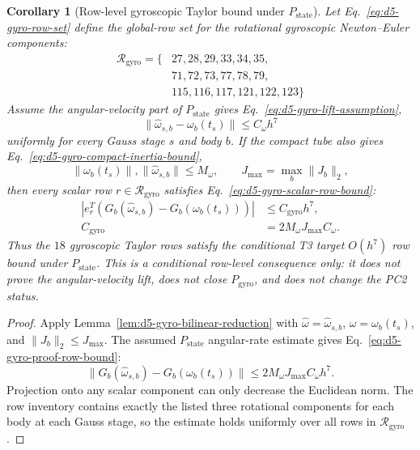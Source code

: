 \documentclass[preprint,12pt]{elsarticle}
\newtheorem{corollary}{Corollary}
\begin{document}
\begin{corollary}[Row-level gyroscopic Taylor bound under \(P_{\mathrm{state}}\)]
\label{cor:d5-gyro-row-bound-under-pstate}
Let Eq.~\eqref{eq:d5-gyro-row-set} define the global-row set for the
rotational gyroscopic Newton--Euler components:
\begin{equation}
\label{eq:d5-gyro-row-set}
\begin{aligned}
\mathcal R_{\mathrm{gyro}}=\{&
27,28,29,33,34,35,\\
&71,72,73,77,78,79,\\
&115,116,117,121,122,123\}
\end{aligned}
\end{equation}
Assume the angular-velocity part of \(P_{\mathrm{state}}\) gives
Eq.~\eqref{eq:d5-gyro-lift-assumption},
\begin{equation}
\label{eq:d5-gyro-lift-assumption}
  \|\widehat\omega_{s,b}-\omega_b(t_s)\|\le C_\omega h^7
\end{equation}
uniformly for every Gauss stage \(s\) and body \(b\).  If the compact tube
also gives Eq.~\eqref{eq:d5-gyro-compact-inertia-bound},
\begin{equation}
\label{eq:d5-gyro-compact-inertia-bound}
  \|\omega_b(t_s)\|,\|\widehat\omega_{s,b}\|\le M_\omega,
  \qquad
  J_{\max}=\max_b\|J_b\|_2,
\end{equation}
then every scalar row \(r\in\mathcal R_{\mathrm{gyro}}\) satisfies
Eq.~\eqref{eq:d5-gyro-scalar-row-bound}:
\begin{equation}
\label{eq:d5-gyro-scalar-row-bound}
\begin{aligned}
  |e_r^T(G_b(\widehat\omega_{s,b})-G_b(\omega_b(t_s)))|
  &\le C_{\mathrm{gyro}} h^7,\\
  C_{\mathrm{gyro}}&=2M_\omega J_{\max}C_\omega .
\end{aligned}
\end{equation}
Thus the \(18\) gyroscopic Taylor rows satisfy the conditional T3 target
\(O(h^7)\) row bound under \(P_{\mathrm{state}}\).  This is a conditional row-level consequence
only: it does not prove the angular-velocity lift, does not close
\(P_{\mathrm{gyro}}\), and does not change the PC2 status.
\end{corollary}

\begin{proof}
Apply Lemma~\ref{lem:d5-gyro-bilinear-reduction} with
\(\widehat\omega=\widehat\omega_{s,b}\), \(\omega=\omega_b(t_s)\), and
\(\|J_b\|_2\le J_{\max}\).  The assumed \(P_{\mathrm{state}}\) angular-rate
estimate gives Eq.~\eqref{eq:d5-gyro-proof-row-bound}:
\begin{equation}
\label{eq:d5-gyro-proof-row-bound}
\|G_b(\widehat\omega_{s,b})-G_b(\omega_b(t_s))\|
\le 2M_\omega J_{\max} C_\omega h^7 .
\end{equation}
Projection onto any scalar component can only decrease the Euclidean norm.
The row inventory contains exactly the listed three rotational
components for each body at each Gauss stage, so the estimate holds uniformly
over all rows in \(\mathcal R_{\mathrm{gyro}}\).
\end{proof}
\end{document}
